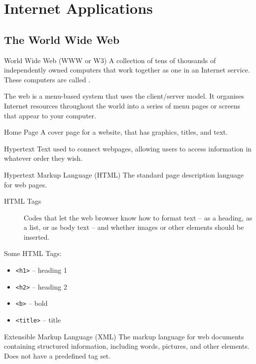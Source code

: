 \documentclass[\main/notes.tex]{subfiles}
\begin{document}
		\section{Internet Applications}
			\subsection{The World Wide Web}
				\begin{definition}{World Wide Web (WWW or W3)}
					A collection of tens of thousands of independently owned computers that work together as one in an Internet service. These computers are called .

					The web is a menu-based system that uses the client/server model. It organises Internet resources throughout the world into a series of menu pages or screens that appear to your computer. 
				\end{definition}
				\begin{definition}{Home Page}
					A cover page for a website, that has graphics, titles, and text.
				\end{definition}
				\begin{definition}{Hypertext}
					Text used to connect webpages, allowing users to access information in whatever order they wish.
				\end{definition}
				\begin{definition}{Hypertext Markup Language (HTML)}
					The standard page description language for web pages.
					\begin{description}
						\item[HTML Tags] Codes that let the web browser know how to format text -- as a heading, as a list, or as body text -- and whether images or other elements should be inserted.
					\end{description}
					\begin{example}
						Some HTML Tags:
						\begin{multicols}{2}
							\begin{itemize}
								\item \texttt{<h1>} -- heading 1
								\item \texttt{<h2>} -- heading 2
								\item \texttt{<b>} -- bold
								\item \texttt{<title>} -- title
							\end{itemize}
						\end{multicols}
					\end{example}
				\end{definition}
				\begin{definition}{Extensible Markup Language (XML)}
					The markup language for web documents containing structured information, including words, pictures, and other elements. Does not have a predefined tag set.
				\end{definition}
\end{document}
